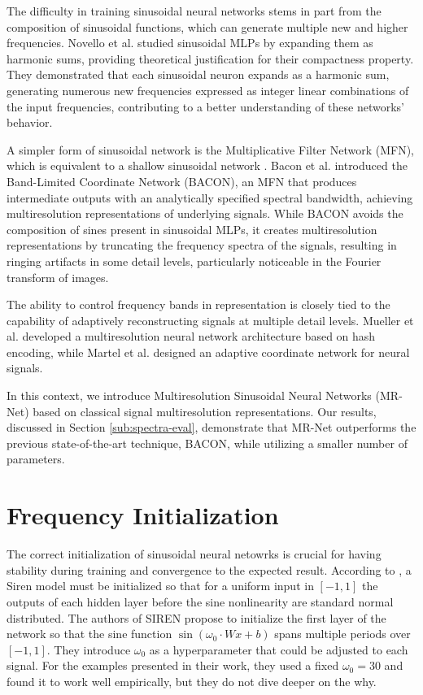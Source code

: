 The difficulty in training sinusoidal neural networks stems in part from the composition of sinusoidal functions, which can generate multiple new and higher frequencies. Novello et al. \cite{novello2022understanding} studied sinusoidal MLPs by expanding them as harmonic sums, providing theoretical justification for their compactness property. They demonstrated that each sinusoidal neuron expands as a harmonic sum, generating numerous new frequencies expressed as integer linear combinations of the input frequencies, contributing to a better understanding of these networks’ behavior.

A simpler form of sinusoidal network is the Multiplicative Filter Network (MFN), which is equivalent to a shallow sinusoidal network \cite{fathony2020multiplicative}. Bacon et al. \cite{bacon2021} introduced the Band-Limited Coordinate Network (BACON), an MFN that produces intermediate outputs with an analytically specified spectral bandwidth, achieving multiresolution representations of underlying signals. While BACON avoids the composition of sines present in sinusoidal MLPs, it creates multiresolution representations by truncating the frequency spectra of the signals, resulting in ringing artifacts in some detail levels, particularly noticeable in the Fourier transform of images.

The ability to control frequency bands in representation is closely tied to the capability of adaptively reconstructing signals at multiple detail levels. Mueller et al. \cite{mueller2022instant} developed a multiresolution neural network architecture based on hash encoding, while Martel et al. \cite{martel2021acorn} designed an adaptive coordinate network for neural signals.

In this context, we introduce Multiresolution Sinusoidal Neural Networks (MR-Net) \cite{paz2022,perez2003} based on classical signal multiresolution representations. Our results, discussed in Section \ref{sub:spectra-eval}, demonstrate that MR-Net outperforms the previous state-of-the-art technique, BACON, while utilizing a smaller number of parameters.



\section{Frequency Initialization}

The correct initialization of sinusoidal neural netowrks is crucial for having stability during training and convergence to the expected result. According to \cite{sitzmann2019siren}, a Siren model must be initialized so that for a uniform input in $[-1, 1]$ the outputs of each hidden layer before the sine nonlinearity are standard normal distributed. The authors of SIREN propose to initialize the first layer of the network so that the sine function $\sin(\omega_0 \cdot W x + b)$
spans multiple periods over $[-1, 1]$. They introduce $\omega_0$ as a hyperparameter that could be adjusted to each signal. For the examples presented in their work, they used a fixed $\omega_0=30$ and found it to work well empirically, but they do not dive deeper on the why. 

